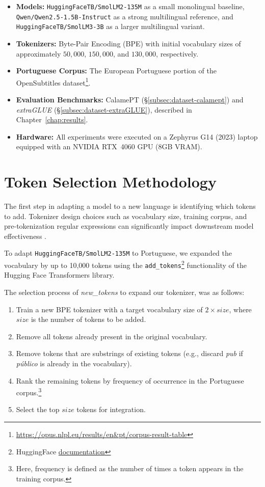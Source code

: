 \begin{itemize}
    \item \textbf{Models:} \texttt{HuggingFaceTB/SmolLM2-135M} as a small monolingual baseline, \texttt{Qwen/Qwen2.5-1.5B-Instruct} as a strong multilingual reference, and \texttt{HuggingFaceTB/SmolLM3-3B} as a larger multilingual variant.
    \item \textbf{Tokenizers:} Byte-Pair Encoding (BPE) with initial vocabulary sizes of approximately $50{,}000$, $150{,}000$, and $130{,}000$, respectively.
    \item \textbf{Portuguese Corpus:} The European Portuguese portion of the OpenSubtitles dataset\footnote{\url{https://opus.nlpl.eu/results/en&pt/corpus-result-table}}.
    \item \textbf{Evaluation Benchmarks:} CalamePT (\S\ref{subsec:dataset-calamept}) and \emph{extraGLUE} (\S\ref{subsec:dataset-extraGLUE}), described in Chapter~\ref{chap:results}.
    \item \textbf{Hardware:} All experiments were executed on a Zephyrus G14 (2023) laptop equipped with an NVIDIA RTX~4060 GPU (8GB VRAM).
\end{itemize}


\section{Token Selection Methodology}
\label{sec:token_selection}

The first step in adapting a model to a new language is identifying which tokens to add. Tokenizer design choices such as vocabulary size, training corpus, and pre-tokenization regular expressions can significantly impact downstream model effectiveness \cite{dagan2024getting}.

To adapt \texttt{HuggingFaceTB/SmolLM2-135M} to Portuguese, we expanded the vocabulary by up to 10,000 tokens using the \texttt{add\_tokens}\footnote{HuggingFace \href{https://huggingface.co/docs/transformers/v4.56.1/en/main\_classes/tokenizer\#transformers.PreTrainedTokenizer.add\_tokens}{documentation}} functionality of the Hugging Face Transformers library. 

The selection process of \textit{new\_tokens} to expand our tokenizer, was as follows:
\begin{enumerate}
    \item Train a new BPE tokenizer with a target vocabulary size of $2 \times size$, where $size$ is the number of tokens to be added.
    \item Remove all tokens already present in the original vocabulary.
    \item Remove tokens that are substrings of existing tokens (e.g., discard \textit{pub} if \textit{público} is already in the vocabulary).
    \item Rank the remaining tokens by frequency of occurrence in the Portuguese corpus.\footnote{Here, frequency is defined as the number of times a token appears in the training corpus.}
    \item Select the top $size$ tokens for integration.
\end{enumerate}

